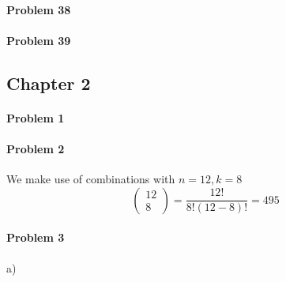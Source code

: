 \paragraph{Problem 38}
\paragraph{Problem 39}
\subsection{Chapter 2}
\paragraph{Problem 1}
\paragraph{Problem 2}
We make use of combinations with $n=12,k=8$
\[
    \begin{pmatrix}12\\8\end{pmatrix}=\frac{12!}{8!(12-8)!}=495
\]
\paragraph{Problem 3}
a)

